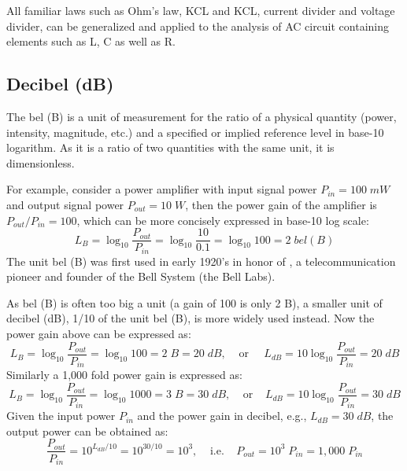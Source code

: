 \documentclass{article}
\begin{document}
All familiar laws such as Ohm's law, KCL and KCL, current divider and voltage
divider, can be generalized and applied to the analysis of AC circuit containing
elements such as L, C as well as R.

\subsection*{Decibel (dB)}

The bel (B) is a unit of measurement for the ratio of a physical quantity 
(power, intensity, magnitude, etc.) and a specified or implied reference 
level in base-10 logarithm. As it is a ratio of two quantities with the same 
unit, it is dimensionless. 

For example, consider a power amplifier with input signal power $P_{in}=100\; mW$ 
and output signal power $P_{out}=10\;W$, then the power gain of the amplifier is 
$P_{out}/P_{in}=100$, which can be more concisely expressed in base-10 log scale:
\begin{equation}
  L_B=\log_{10} \frac{P_{out}}{P_{in}}=\log_{10} \frac{10}{0.1} =\log_{10} 100 =2\; bel(B)
\end{equation}
The unit bel (B) was first used in early 1920's in honor of 
,
a telecommunication pioneer and founder of the Bell System (the Bell Labs).

As bel (B) is often too big a unit (a gain of 100 is only 2 B), a smaller
unit of decibel (dB), 1/10 of the unit bel (B), is more widely used instead. 
Now the power gain above can be expressed as:
\begin{equation}
  L_B=\log_{10}\frac{P_{out}}{P_{in}}=\log_{10} 100 =2\;B=20\;dB,
  \;\;\;\;\mbox{or}\;\;\;\;\;
  L_{dB}=10 \log_{10}\frac{P_{out}}{P_{in}}=20\;dB 
\end{equation}
Similarly a 1,000 fold power gain is expressed as:
\begin{equation} 
  L_B=\log_{10}\frac{P_{out}}{P_{in}}=\log_{10} 1000 =3\;B=30\;dB,
  \;\;\;\;\mbox{or}\;\;\;\;
  L_{dB}=10 \log_{10}\frac{P_{out}}{P_{in}}=30\;dB 
\end{equation}
Given the input power $P_{in}$ and the power gain in decibel, e.g., 
$L_{dB}=30\;dB$, the output power can be obtained as:
\begin{equation}
  \frac{P_{out}}{P_{in}}=10^{L_{dB}/10}=10^{30/10}=10^3,
  \;\;\;\;\mbox{i.e.}\;\;\;\;P_{out} =10^3\;P_{in}=1,000\;P_{in} 
\end{equation}
\end{document}
